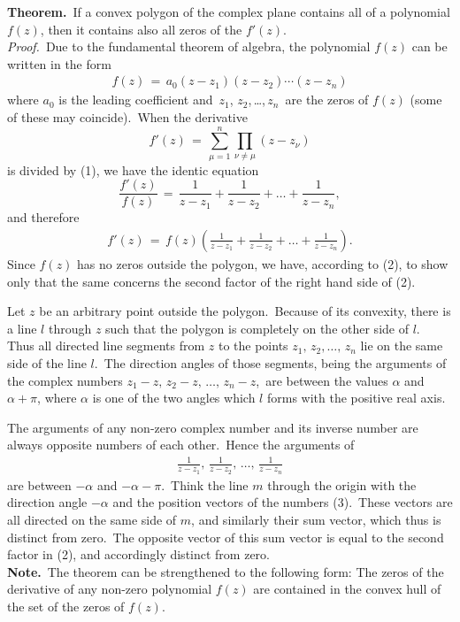 \documentclass[12pt]{article}
\theoremstyle{definition}
\begin{document}
 

\textbf{Theorem.}\, If a convex polygon of the complex plane contains all  of a polynomial $f(z)$, then it contains also all zeros of the  $f'(z)$.\\

{\em Proof.}\, Due to the fundamental theorem of algebra, the polynomial $f(z)$ can be written in the form
\begin{align}
f(z) \,=\, a_0(z-z_1)(z-z_2)\cdots(z-z_n)
\end{align}
where $a_0$ is the leading coefficient and\, $z_1$, $z_2$,\,\ldots,\,$z_n$\, are the zeros of $f(z)$ (some of these may coincide).\, When the derivative
$$f'(z) \,=\, \sum_{\mu=1}^n\prod_{\nu\neq\mu}(z-z_\nu)$$
is divided by (1), we have the identic equation
$$\frac{f'(z)}{f(z)} \,=\, \frac{1}{z\!-\!z_1}+\frac{1}{z\!-\!z_2}+\ldots+\frac{1}{z\!-\!z_n},$$
and therefore
\begin{align}
f'(z) \,=\, f(z)\!\left(\frac{1}{z\!-\!z_1}+\frac{1}{z\!-\!z_2}+\ldots+\frac{1}{z\!-\!z_n}\right).
\end{align}
Since $f(z)$ has no zeros outside the polygon, we have, according to (2), to show only that the same concerns the second factor of the right hand side of (2).

Let $z$ be an arbitrary point outside the polygon.\, Because of its convexity, there is a line $l$ through $z$ such that the polygon is completely on the other side of $l$.\, Thus all directed line segments from $z$ to the points $z_1,\, z_2, \ldots,\, z_n$ lie on the same side of the line $l$.\, The direction angles of those segments, being the arguments of the complex numbers $z_1\!-\!z,\, z_2\!-\!z,\, \ldots,\, z_n\!-\!z$,\, are between the values $\alpha$ and 
$\alpha\!+\!\pi$, where $\alpha$ is one of the two angles which $l$ forms with the positive real axis.\, 

The arguments of any non-zero complex number and its inverse number are always opposite numbers of each other.\, Hence the arguments of
\begin{align}
\frac{1}{z\!-\!z_1},\,\frac{1}{z\!-\!z_2},\,\ldots,\,\frac{1}{z\!-\!z_n}
\end{align}
are between $-\alpha$ and $-\alpha\!-\!\pi$.\, Think the line $m$ through the origin with the direction angle $-\alpha$ and the position vectors of the numbers (3).\, These vectors are all directed on the same side of $m$, and similarly their sum vector, which thus is distinct from zero.\, The opposite vector of this sum vector is equal to the second factor in (2), and accordingly distinct from zero.\\

\textbf{Note.}\, The theorem can be strengthened to the following form:\; The zeros of the derivative of any non-zero polynomial $f(z)$ are contained in the convex hull of the set of the zeros of $f(z)$.


\end{document}
